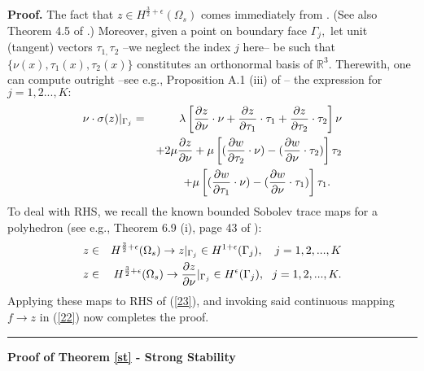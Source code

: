 \documentclass[11pt]{article}
\newenvironment{proof}[1][Proof]{\textbf{#1.} }{\ \rule{0.5em}{0.5em}}
\begin{document}
\begin{proof}
The fact that $z\in H^{\frac{3}{2}+\epsilon }(\Omega _{s})$ comes
immediately from \cite[Theorem 4.5.1, p. 140, see also the remark on p. 149]{Grisvard}. (See also Theorem 4.5
of \cite{Nicaise}.) Moreover, given a point on boundary face $\Gamma _{j},$ let
unit (tangent) vectors $\tau _{1,}\tau _{2}$ --we neglect the index $j$ here--
be such that $\{\nu (x),\tau _{1}(x),\tau _{2}(x)\}$ constitutes an
orthonormal basis of $%
\mathbb{R}
^{3}.$ Therewith, one can compute outright --see e.g., Proposition A.1 (iii)
of \cite{Avalos-Trigg}-- the expression for $j=1,2...,K:$%
\begin{eqnarray}
\nu \cdot \sigma (z)|_{\Gamma _{j}} &=&\lambda \left[ \frac{\partial z}{%
\partial \nu }\cdot \nu +\frac{\partial z}{\partial \tau _{1}}\cdot \tau
_{1}+\frac{\partial z}{\partial \tau _{2}}\cdot \tau _{2}\right] \nu  
\nonumber \\
&&+2\mu \frac{\partial z}{\partial \nu }+\mu \left[ (\frac{\partial w}{%
\partial \tau _{2}}\cdot \nu )-(\frac{\partial w}{\partial \nu }\cdot \tau
_{2})\right] \tau _{2}  \nonumber \\
&&+\mu \left[ (\frac{\partial w}{\partial \tau _{1}}\cdot \nu )-(\frac{%
\partial w}{\partial \nu }\cdot \tau _{1})\right] \tau _{1}.\text{ \ \ }
\label{23}
\end{eqnarray}%
To deal with RHS, we recall the known bounded Sobolev trace maps for a
polyhedron (see e.g., Theorem 6.9 (i), page 43 of \cite{Dauge-et-al}):%
\begin{eqnarray}
z &\in &H^{\frac{3}{2}+\epsilon }(\Omega _{s})\rightarrow z|_{\Gamma
_{j}}\in H^{1+\epsilon }(\Gamma _{j}),\text{ \ }\ j=1,2,...,K  \nonumber \\
z &\in &H^{\frac{3}{2}+\epsilon }(\Omega _{s})\rightarrow \frac{\partial z}{%
\partial \nu }|_{\Gamma _{j}}\in H^{\epsilon }(\Gamma _{j}),\text{ \ }%
j=1,2,...,K.  \label{24}
\end{eqnarray}%
Applying these maps to RHS of (\ref{23}), and invoking said continuous
mapping $f\rightarrow z$ in (\ref{22}) now completes the proof.
\end{proof}
\newpage
\noindent \textbf{Proof of Theorem \ref{st} - Strong Stability}
\end{document}
